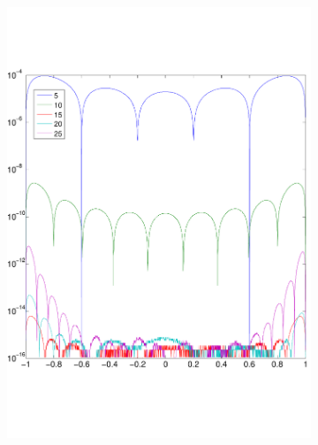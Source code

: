 \documentclass[a4paper, 12pt, titlepage]{report}
\begin{document}
 \begin{figure}
 \begin{subfigure}{0.5\textwidth}
 \centering
 \includegraphics[width=\textwidth]{errorCos1.pdf}
 \end{subfigure}
 \begin{subfigure}{0.5\textwidth}
 \centering

\end{subfigure}
\end{figure}
\end{document}
